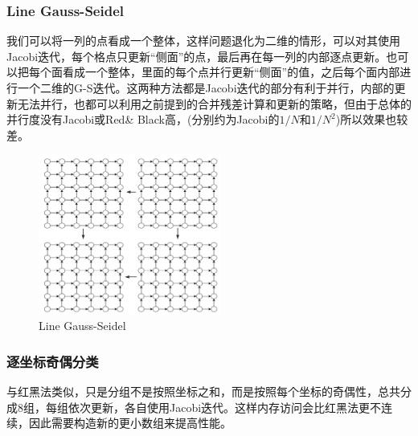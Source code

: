 \documentclass{article}
\begin{document}
\subsubsection{Line Gauss-Seidel}
我们可以将一列的点看成一个整体，这样问题退化为二维的情形，可以对其使用Jacobi迭代，每个格点只更新“侧面”的点，最后再在每一列的内部逐点更新。也可以把每个面看成一个整体，里面的每个点并行更新“侧面”的值，之后每个面内部进行一个二维的G-S迭代。这两种方法都是Jacobi迭代的部分有利于并行，内部的更新无法并行，也都可以利用之前提到的合并残差计算和更新的策略，但由于总体的并行度没有Jacobi或Red\& Black高，(分别约为Jacobi的$1/N$和$1/N^2$)所以效果也较差。
\begin{figure}[H]
	\centering
	\includegraphics[width=6cm]{./fig/lgs}
	\caption{Line Gauss-Seidel}
\end{figure}
\subsubsection{逐坐标奇偶分类}
与红黑法类似，只是分组不是按照坐标之和，而是按照每个坐标的奇偶性，总共分成8组，每组依次更新，各自使用Jacobi迭代。这样内存访问会比红黑法更不连续，因此需要构造新的更小数组来提高性能。
\end{document}
